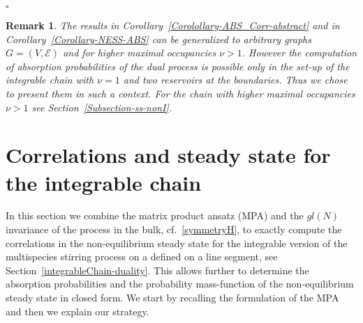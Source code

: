 \documentclass[10pt]{article}
\numberwithin{equation}{section}
\numberwithin{equation}{subsection}
\newtheorem{remark}{Remark}
\begin{document}
\begin{flushright}
	$\square$
\end{flushright}
\begin{remark}\label{Remark-extension-graph-nu}
	The results in Corollary~\ref{Corolollary-ABS_Corr-abstract} and in Corollary~\ref{Corollary-NESS-ABS}  can be generalized to arbitrary graphs $G=(V,\mathcal{E})$ and for higher maximal occupancies $\nu >1$.
	However the computation of absorption probabilities of the dual process is possible only in the set-up of the integrable chain with $\nu =1$ and two reservoirs at the boundaries.
	Thus we chose to present them in such a context. For the chain with higher maximal occupancies $\nu >1$ see Section~\ref{Subsection-ss-nonI}.
\end{remark}





\section{Correlations and steady state  for the integrable chain}\label{sectionIntegrabiliy}
In this section we combine the matrix product ansatz (MPA) \cite{vanicat2017exact} and  the $gl(N)$ invariance of the process in the bulk, cf.~\eqref{symmetryH}, to exactly compute the correlations in the non-equilibrium steady state
 for the integrable version of the multispecies stirring process on a defined on a line segment, see Section~\ref{integrableChain-duality}. 
This allows further to determine the absorption probabilities and the probability mass-function of the non-equilibrium steady state in closed form.
We start by recalling the formulation of the MPA  and then we explain our strategy.


\end{document}
